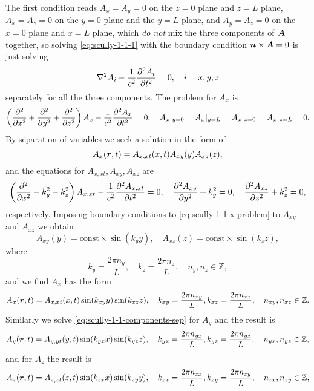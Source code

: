 \documentclass[hyperref, a4paper]{article}
\begin{document}
The first condition reads $A_x = A_y = 0$ on the $z=0$ plane and $z=L$ plane, $A_x = A_z = 0$ on the $y=0$ plane and the $y=L$ plane, and $A_y = A_z = 0$ on the $x=0$ plane and $x=L$ plane, which \emph{do not} mix the three components of $\vb*{A}$ together, so solving \eqref{eq:scully-1-1-1} with the boundary condition $\vb*{n} \times \vb*{A} = 0$ is just solving
\begin{equation}
    \laplacian A_i - \frac{1}{c^2} \pdv[2]{A_i}{t} = 0, \quad i = x, y, z
    \label{eq:scully-1-1-components-sep}
\end{equation}
separately for all the three components.
The problem for $A_x$ is 
\begin{equation}
    \left( \pdv[2]{x} + \pdv[2]{y} + \pdv[2]{z} \right) A_x - \frac{1}{c^2} \pdv[2]{A_x}{t} = 0, \quad A_x|_{y=0} = A_x|_{y=L} = A_x|_{z=0} = A_x|_{z=L} = 0.
    \label{eq:scully-1-1-x-problem}
\end{equation}
By separation of variables we seek a solution in the form of
\[
    A_x(\vb*{r}, t) = A_{x,xt}(x, t) A_{xy}(y) A_{xz}(z),
\]
and the equations for $A_{x, xt}, A_{xy}, A_{xz}$ are
\[
    \left( \pdv[2]{x} - k_y^2 - k_z^2 \right) A_{x, xt} - \frac{1}{c^2} \pdv[2]{A_{x, xt}}{t} = 0, \quad \pdv[2]{A_{xy}}{y} + k_y^2 = 0, \quad \pdv[2]{A_{xz}}{z} + k_z^2 = 0,
\]
respectively. Imposing boundary conditions to \eqref{eq:scully-1-1-x-problem} to $A_{xy}$ and $A_{xz}$ we obtain
\[
    A_{xy}(y) = \text{const} \times \sin(k_y y) , \quad A_{xz}(z) = \text{const} \times \sin(k_z z),
\]
where
\begin{equation}
    k_y = \frac{2\pi n_y}{L}, \quad k_z = \frac{2\pi n_z}{L}, \quad n_y, n_z \in \mathbb{Z},
    \label{eq:scully-1-1-ky-kz-conds}
\end{equation}
and we find $A_{x}$ has the form
\begin{equation}
    A_{x}(\vb*{r}, t) = A_{x, xt}(x, t) \sin(k_{xy} y) \sin(k_{xz} z), \quad k_{xy} = \frac{2\pi n_{xy}}{L}, k_{xz} = \frac{2\pi n_{xz}}{L}, \quad n_{xy}, n_{xz} \in \mathbb{Z}.
    \label{eq:scully-1-1-ax-form}
\end{equation}
Similarly we solve \eqref{eq:scully-1-1-components-sep} for $A_y$ and the result is
\begin{equation}
    A_{y}(\vb*{r}, t) = A_{y, yt}(y, t) \sin(k_{yx} x) \sin(k_{yz} z), \quad k_{yx} = \frac{2\pi n_{yx}}{L}, k_{yz} = \frac{2\pi n_{yz}}{L}, \quad n_{yx}, n_{yz} \in \mathbb{Z},
    \label{eq:scully-1-1-ay-form}
\end{equation}
and for $A_z$ the result is
\begin{equation}
    A_{z}(\vb*{r}, t) = A_{z, zt}(z, t) \sin(k_{zx} x) \sin(k_{zy} y), \quad k_{zx} = \frac{2\pi n_{zx}}{L}, k_{zy} = \frac{2\pi n_{zy}}{L}, \quad n_{zx}, n_{zy} \in \mathbb{Z},
    \label{eq:scully-1-1-az-form}
\end{equation}
\end{document}
